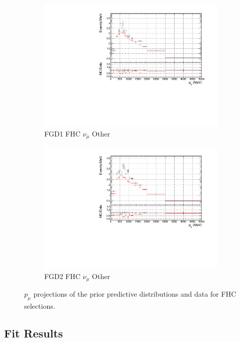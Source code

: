 \begin{figure}[!htbp]
\begin{subfigure}{0.49\textwidth}
  \centering
  \includegraphics[width=\textwidth]{figs/prioronly1D_p_FGD1_numuCC_other}
  \caption{FGD1 FHC $\nu_{\mu}$ Other}
\end{subfigure}
\begin{subfigure}{0.49\textwidth}
  \centering
  \includegraphics[width=\textwidth]{figs/prioronly1D_p_FGD2_numuCC_other}
  \caption{FGD2 FHC $\nu_{\mu}$ Other}
  \label{fig:priorpost_FGD2_numuCC_other}
\end{subfigure}
\caption{$p_{\mu}$ projections of the prior predictive distributions and data for FHC \numu selections.}
\label{fig:priorpred_fhc_p}
\end{figure}

\subsection{Fit Results}

